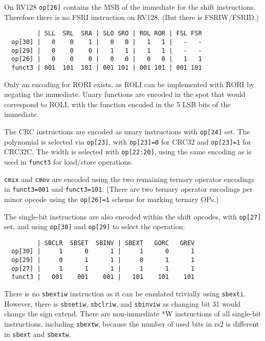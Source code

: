 On RV128 {\tt op[26]} contains the MSB of the immediate for the shift instructions.
Therefore there is no FSRI instruction on RV128. (But there is FSRIW/FSRID.)

\begin{minipage}{\linewidth}
\begin{verbatim}
         | SLL  SRL  SRA | SLO SRO | ROL ROR | FSL FSR
  op[30] |   0    0    1 |   0   0 |   1   1 |   -   -
  op[29] |   0    0    0 |   1   1 |   1   1 |   -   -
  op[26] |   0    0    0 |   0   0 |   0   0 |   1   1
  funct3 | 001  101  101 | 001 101 | 001 101 | 001 101
\end{verbatim}
\end{minipage}

Only an encoding for RORI exists, as ROLI can be implemented with RORI by negating
the immediate. Unary functions are encoded in the spot that would correspond to ROLI,
with the function encoded in the 5 LSB bits of the immediate.

The CRC instructions are encoded as unary instructions with {\tt op[24]} set. The
polynomial is selected via {\tt op[23]}, with {\tt op[23]=0} for CRC32 and
{\tt op[23]=1} for CRC32C. The width is selected with {\tt op[22:20]}, using
the same encoding as is used in {\tt funct3} for load/store operations.

{\tt cmix} and {\tt cmov} are encoded using the two remaining ternary operator
encodings in {\tt funct3=001} and {\tt funct3=101}. (There are two ternary
operator encodings per minor opcode using the {\tt op[26]=1} scheme for
marking ternary OPs.)

The single-bit instructions are also encoded within the shift opcodes, with
{\tt op[27]} set, and using {\tt op[30]} and {\tt op[29]} to select the operation:

\begin{minipage}{\linewidth}
\begin{verbatim}
         | SBCLR  SBSET  SBINV | SBEXT   GORC   GREV
  op[30] |     1      0      1 |     1      0      1
  op[29] |     0      1      1 |     0      1      1
  op[27] |     1      1      1 |     1      1      1
  funct3 |   001    001    001 |   101    101    101
\end{verbatim}
\end{minipage}

There is no {\tt sbextiw} instruction as it can be emulated trivially using
{\tt sbexti}. However, there is {\tt sbsetiw}, {\tt sbclriw}, and {\tt sbinviw}
as changing bit 31 would change the sign extend. There are non-immediate *W
instructions of all single-bit instructions, including {\tt sbextw}, because
the number of used bits in rs2 is different in {\tt sbext} and {\tt sbextw}.

